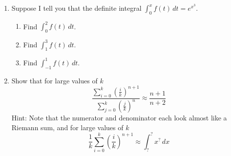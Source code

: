 \documentclass{article}
\begin{document}
\begin{itemize}
\begin{enumerate}
                    \item Suppose I tell you that the definite integral
$\displaystyle \int_0^x f(t)\,dt = e^{x^3}$.
\begin{enumerate}
    \item Find $\displaystyle \int_0^2 f(t) \,dt$.
    \item Find $\displaystyle \int_1^3 f(t)\,dt$.
    \item Find $\displaystyle \int_{-1}^1 f(t)\,dt$.
\end{enumerate}
\item Show that for large values of $k$
       $$\displaystyle \frac{\sum_{i=0}^k \left(\frac{i}{k}\right)^{n+1}}{\sum_{j=0}^k \left(\frac{j}{k}\right)^{n}}\approx\frac{n+1}{n+2}$$
Hint: Note that the numerator and denominator each look almost like a Riemann sum, and for large values of $k$
$$ \displaystyle \frac{1}{k}\sum_{i=0}^k\left(\frac{i}{k}\right)^{n+1}\approx \int_?^?x^?\,dx$$
                \end{enumerate}
        \end{itemize}
\end{document}
